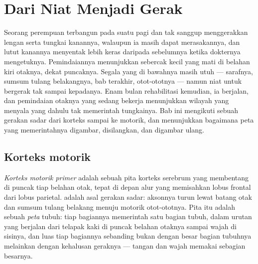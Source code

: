 \chapter{Dari Niat Menjadi Gerak}\label{ch:g12:brain-and-movement}

Seorang perempuan terbangun pada suatu pagi dan tak sanggup
menggerakkan lengan serta tungkai kanannya, walaupun ia masih dapat
merasakannya, dan lutut kanannya menyentak lebih keras daripada
sebelumnya ketika dokternya mengetuknya. Pemindaiannya menunjukkan
sebercak kecil yang mati di belahan kiri otaknya, dekat puncaknya.
Segala yang di bawahnya masih utuh --- sarafnya, sumsum tulang
belakangnya,  bab terakhir, otot-ototnya --- namun
niat untuk bergerak tak sampai kepadanya. Enam bulan rehabilitasi
kemudian, ia berjalan, dan pemindaian otaknya yang sedang bekerja
menunjukkan wilayah yang menyala yang dahulu tak memerintah
tungkainya. Bab ini mengikuti sebuah gerakan sadar dari korteks sampai
ke  motorik, dan menunjukkan bagaimana peta yang memerintahnya
digambar, disilangkan, dan digambar ulang.

\section{Korteks motorik}

\begin{definition}\label{def:g12:brain-and-movement:cortex}
\emph{Korteks motorik primer} adalah sebuah
pita korteks serebrum yang membentang di puncak tiap belahan otak,
tepat di depan alur yang memisahkan lobus frontal dari lobus parietal.
 adalah asal gerakan sadar: aksonnya turun lewat batang otak
dan sumsum tulang belakang menuju  motorik otot-ototnya. Pita itu
adalah sebuah \emph{peta} tubuh: tiap bagiannya memerintah satu bagian
tubuh, dalam urutan yang berjalan dari telapak kaki di puncak belahan
otaknya sampai wajah di sisinya, dan luas tiap bagiannya sebanding
bukan dengan besar bagian tubuhnya melainkan dengan kehalusan
geraknya --- tangan dan wajah memakai sebagian besarnya.
\end{definition}

